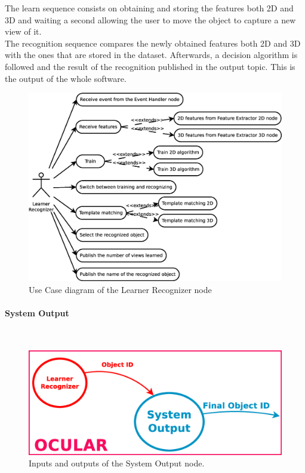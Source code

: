 	The learn sequence consists on obtaining and storing the features both 2D and 3D and waiting a second allowing the user to move the object to capture a new view of it. 
	\\

	The recognition sequence compares the newly obtained features both 2D and 3D with the ones that are stored in the dataset. Afterwards, a decision algorithm is followed and the result of the recognition published in the output topic. This is the output of the whole software. 

	\begin{figure}[H]
		\centering
			\includegraphics[scale=0.4]{img/diagrams/uc_learner_recognizer.eps}
			\caption[Use case diagram Learner Recognizer node]{Use Case diagram of the Learner Recognizer node}
		
	\end{figure}

\newpage


\paragraph{System Output}\mbox{}\\


		\begin{figure}[H]
			\begin{center}
			\includegraphics[width=0.5\linewidth]{img/diagrams/node_output.eps}
			\caption[System Output node I/O]{Inputs and outputs of the System Output node.}		
			\label{node_output}
			\end{center}
		\end{figure}



